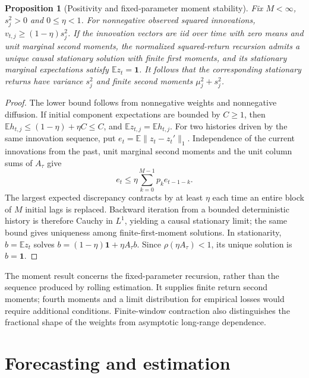 \documentclass[12pt,a4paper]{article}
\newtheorem{proposition}{Proposition}
\newcommand{\E}{\mathbb E}
\newcommand{\one}{\mathbf 1}
\begin{document}
\begin{proposition}[Positivity and fixed-parameter moment stability]
Fix $M<\infty$, $s_j^2>0$ and $0\le\eta<1$. For nonnegative observed squared
innovations, $v_{t,j}\ge(1-\eta)s_j^2$. If the innovation vectors are iid over time
with zero means and unit marginal second moments, the normalized squared-return
recursion admits a unique causal stationary solution with finite first moments,
and its stationary marginal expectations satisfy $\E z_t=\one$. It follows that
the corresponding stationary returns have variance $s_j^2$ and finite second
moments $\mu_j^2+s_j^2$.
\label{prop:stability}
\end{proposition}
\begin{proof}
The lower bound follows from nonnegative weights and nonnegative diffusion.
If initial component expectations are bounded by $C\ge1$, then
$\E h_{t,j}\le(1-\eta)+\eta C\le C$, and $\E z_{t,j}=\E h_{t,j}$.
For two histories driven by the same innovation sequence, put
$e_t=\E\lVert z_t-z_t'\rVert_1$. Independence of the current innovations from the
past, unit marginal second moments and the unit column sums of $A_\tau$ give
\begin{equation}
e_t\le\eta\sum_{k=0}^{M-1}p_ke_{t-1-k}.
\label{eq:coupling}
\end{equation}
The largest expected discrepancy contracts by at least $\eta$ each time an
entire block of $M$ initial lags is replaced. Backward iteration from a bounded
deterministic history is therefore Cauchy in $L^1$, yielding a causal stationary
limit; the same bound gives uniqueness among finite-first-moment solutions.
In stationarity, $b=\E z_t$ solves
$b=(1-\eta)\one+\eta A_\tau b$. Since $\rho(\eta A_\tau)<1$, its unique solution
is $b=\one$.
\end{proof}

The moment result concerns the fixed-parameter recursion, rather than the
sequence produced by rolling estimation. It supplies finite return second
moments; fourth moments and a limit distribution for empirical losses would
require additional conditions. Finite-window contraction also distinguishes
the fractional shape of the weights from asymptotic long-range dependence.

\section{Forecasting and estimation}
\end{document}
